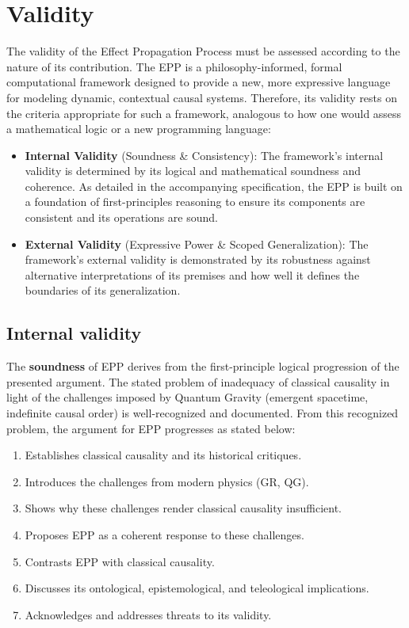 \section{Validity}
\label{sec:validity}

The validity of the Effect Propagation Process must be assessed according to the nature of its contribution. The EPP is
a philosophy-informed, formal computational framework designed to provide a new, more expressive language for modeling
dynamic, contextual causal systems. Therefore, its validity rests on the criteria appropriate for such a framework,
analogous to how one would assess a mathematical logic or a new programming language:

\begin{itemize}
    \item \textbf{Internal Validity} (Soundness \& Consistency): The framework's internal validity is determined by its logical and  mathematical soundness and coherence. As detailed in the accompanying specification, the EPP is built on a foundation  of first-principles reasoning to ensure its components are consistent and its operations are sound.
  \item \textbf{External Validity} (Expressive Power \& Scoped Generalization): The framework's external validity is demonstrated by its
  robustness against alternative interpretations of its premises and how well it defines the boundaries of its
  generalization.
\end{itemize}


\subsection{Internal validity}
\label{sec:validity_internal}

The \textbf{soundness} of EPP derives from the first-principle logical progression of the presented argument. The stated problem of inadequacy of classical causality in light of the challenges imposed by Quantum Gravity (emergent spacetime, indefinite causal order) is well-recognized and documented\cite{MriniHardyIndefinite}.
From this recognized problem, the argument for EPP progresses as stated below:

\begin{enumerate}
    \item Establishes classical causality and its historical critiques.
    \item Introduces the challenges from modern physics (GR, QG).
    \item Shows why these challenges render classical causality insufficient.
    \item Proposes EPP as a coherent response to these challenges.
    \item Contrasts EPP with classical causality.
    \item Discusses its ontological, epistemological, and teleological implications.
    \item Acknowledges and addresses threats to its validity.
\end{enumerate}


